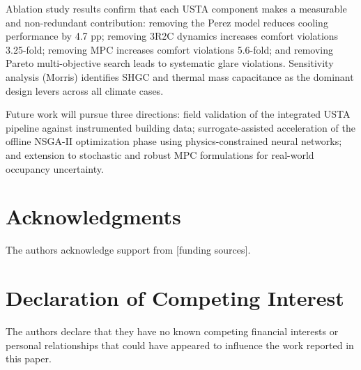\documentclass[preprint,12pt]{elsarticle}
\begin{document}
Ablation study results confirm that each USTA component makes a measurable and non-redundant contribution: removing the Perez model reduces cooling performance by 4.7 pp; removing 3R2C dynamics increases comfort violations 3.25-fold; removing MPC increases comfort violations 5.6-fold; and removing Pareto multi-objective search leads to systematic glare violations. Sensitivity analysis (Morris) identifies SHGC and thermal mass capacitance as the dominant design levers across all climate cases.

Future work will pursue three directions: field validation of the integrated USTA pipeline against instrumented building data; surrogate-assisted acceleration of the offline NSGA-II optimization phase using physics-constrained neural networks; and extension to stochastic and robust MPC formulations for real-world occupancy uncertainty.

\section*{Acknowledgments}
The authors acknowledge support from [funding sources].

\section*{Declaration of Competing Interest}
The authors declare that they have no known competing financial interests or personal relationships that could have appeared to influence the work reported in this paper.


\end{document}
